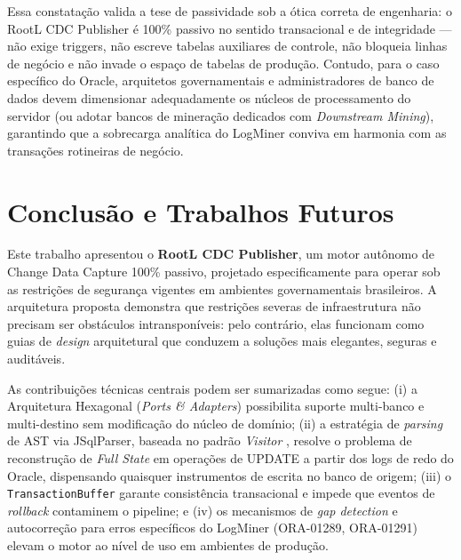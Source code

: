 \documentclass[12pt]{article}
\begin{document}
Essa constatação valida a tese de passividade sob a ótica correta de engenharia: o RootL CDC Publisher é 100\% passivo no sentido transacional e de integridade — não exige triggers, não escreve tabelas auxiliares de controle, não bloqueia linhas de negócio e não invade o espaço de tabelas de produção. Contudo, para o caso específico do Oracle, arquitetos governamentais e administradores de banco de dados devem dimensionar adequadamente os núcleos de processamento do servidor (ou adotar bancos de mineração dedicados com \textit{Downstream Mining}), garantindo que a sobrecarga analítica do LogMiner conviva em harmonia com as transações rotineiras de negócio.

\section{Conclusão e Trabalhos Futuros}
\label{sec:conclusion}

Este trabalho apresentou o \textbf{RootL CDC Publisher}, um motor autônomo
de Change Data Capture 100\% passivo, projetado especificamente para operar
sob as restrições de segurança vigentes em ambientes governamentais
brasileiros. A arquitetura proposta demonstra que restrições severas de
infraestrutura não precisam ser obstáculos intransponíveis: pelo contrário,
elas funcionam como guias de \textit{design} arquitetural que conduzem a
soluções mais elegantes, seguras e auditáveis.

As contribuições técnicas centrais podem ser sumarizadas como segue:
(i) a Arquitetura Hexagonal (\textit{Ports \& Adapters}) \cite{cockburn:2005}
possibilita suporte multi-banco e multi-destino sem modificação do núcleo de
domínio; (ii) a estratégia de \textit{parsing} de AST via JSqlParser, baseada
no padrão \textit{Visitor} \cite{aho:2006}, resolve o problema de
reconstrução de \textit{Full State} em operações de UPDATE a partir dos logs
de redo do Oracle, dispensando quaisquer instrumentos de escrita no banco de
origem; (iii) o \texttt{TransactionBuffer} garante consistência transacional
e impede que eventos de \textit{rollback} contaminem o pipeline; e
(iv) os mecanismos de \textit{gap detection} e autocorreção para erros
específicos do LogMiner (ORA-01289, ORA-01291) \cite{oracle:2023} elevam
o motor ao nível de uso em ambientes de produção.
\end{document}
